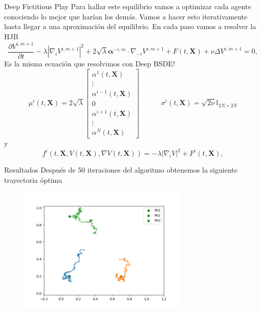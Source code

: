 \documentclass[aspectratio=169,xcolor=dvipsnames]{beamer}
\newcommand{\bfX}{\mathbf{X}}
\newcommand{\bfAlp}{\bm{\alpha}}
\newcommand{\dpartial}[2]{\frac{\partial #1}{\partial #2}}
\begin{document}
\begin{frame}{Deep Fictitious Play}
	Para hallar este equilibrio vamos a optimizar cada agente conociendo lo mejor que harían los demás. Vamos a hacer esto iterativamente hasta llegar a una aproximación del equilibrio. En cada paso vamos a resolver la HJB
	\begin{equation}
		\dpartial{V^{i,m+1}}{t}-\lambda|\nabla_i V^{i,m+1}|^2+2\sqrt{\lambda}\bfAlp^{-i,m}\cdot \nabla_{-i} V^{i,m+1}+F(t,\bfX)+\nu\Delta V^{i,m+1}=0,
	\end{equation}
	Es la misma ecuación que resolvimos con Deep BSDE! 
	\begin{equation}
		\mu^i(t,\bfX)=2\sqrt{\lambda}\begin{bmatrix}
			\alpha^1(t,\bfX) \\
			\vdots\\
			\alpha^{i-1}(t,\bfX) \\
			0\\
			\alpha^{i+1}(t,\bfX)\\
			\vdots   \\
			\alpha^N(t,\bfX)
		\end{bmatrix}
		\quad\quad\quad
		\sigma^i(t,\bfX)=\sqrt{2\nu}\mathbb{I}_{2N\times 2N}
	\end{equation}
	y
	\begin{equation}
		f^i(t,\bfX,V(t,\bfX),\nabla V(t,\bfX))=-\lambda|\nabla_i V|^2+F^i(t,\bfX),
	\end{equation}
\end{frame}


\begin{frame}{Resultados}
	Después de 50 iteraciones del algoritmo obtenemos la siguiente trayectoria óptima
	\begin{figure}
		\centering
		\includegraphics[height=6cm]{images/OptimalLQRDeepFictitus}
		\label{fig:optimallqrdeepfictitus}
	\end{figure}
\end{frame}
\end{document}
